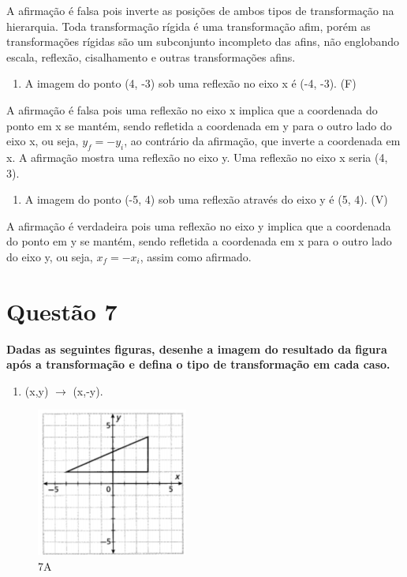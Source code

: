 \documentclass[12pt]{article}
\begin{document}
A afirmação é falsa pois inverte as posições de ambos tipos de transformação na hierarquia. Toda transformação rígida é uma transformação afim, porém as transformações rígidas são um subconjunto incompleto das afins, não englobando escala, reflexão, cisalhamento e outras transformações afins. 

\begin{enumerate}[label=\alph*), resume]
    \item A imagem do ponto (4, -3) sob uma reflexão no eixo x é (-4, -3). (F)
\end{enumerate}

A afirmação é falsa pois uma reflexão no eixo x implica que a coordenada do ponto em x se mantém, sendo refletida a coordenada em y para o outro lado do eixo x, ou seja, $y_f = -y_i$, ao contrário da afirmação, que inverte a coordenada em x. A afirmação mostra uma reflexão no eixo y. Uma reflexão no eixo x seria (4, 3).

\begin{enumerate}[label=\alph*), resume]
    \item A imagem do ponto (-5, 4) sob uma reflexão através do eixo y é (5, 4). (V)
\end{enumerate}

A afirmação é verdadeira pois uma reflexão no eixo y implica que a coordenada do ponto em y se mantém, sendo refletida a coordenada em x para o outro lado do eixo y, ou seja, $x_f = -x_i$, assim como afirmado.

\section*{Questão 7}
{\bfseries Dadas as seguintes figuras, desenhe a imagem do resultado da figura após a transformação e defina o tipo de transformação em cada caso.}

\begin{enumerate}[label=\alph*)]
    \item (x,y) $\xrightarrow{}$ (x,-y). 
\end{enumerate}

\begin{figure}[H]
    \centering
    \includegraphics{images/7a.png}
    \caption{7A}
    \label{fig:7a}
\end{figure}{}
\end{document}
